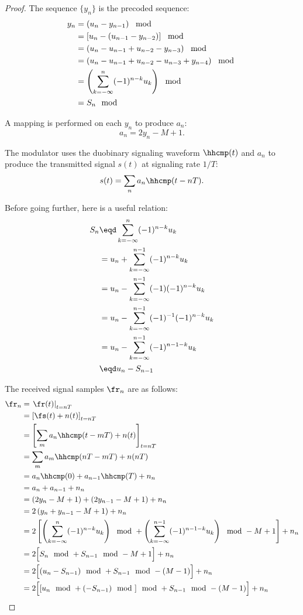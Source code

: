 \begin{proof}

The sequence $\{y_n\}$ is the precoded sequence:
\begin{align*}
   y_n
     &= \left( u_n - y_{n-1} \right)\mod
   \\&= \left[ u_n - (u_{n-1}-y_{n-2}) \right]\mod
   \\&= \left( u_n - u_{n-1} + u_{n-2}-y_{n-3} \right)\mod
   \\&= \left( u_n - u_{n-1} + u_{n-2}-u_{n-3}+y_{n-4} \right)\mod
   \\&= \left( \sum_{k=-\infty}^n (-1)^{n-k} u_k \right)\mod
   \\&= S_n \mod
\end{align*}

A mapping is performed on each $y_n$ to produce $a_n$:
\[ a_n = 2y_n - M + 1.\]

The modulator uses the duobinary signaling waveform $\hhcmp(t)$
and $a_n$ to produce the transmitted signal $s(t)$ at signaling
rate $1/T$:
\[ s(t) = \sum_n a_n \hhcmp(t-nT). \]


Before going further, here is a useful relation:
\begin{align*}
  S_n
    &\eqd \sum_{k=-\infty}^{n} (-1)^{n-k} u_k
  \\&=    u_n + \sum_{k=-\infty}^{n-1} (-1)^{n-k} u_k
  \\&=    u_n - \sum_{k=-\infty}^{n-1} (-1)(-1)^{n-k} u_k
  \\&=    u_n - \sum_{k=-\infty}^{n-1} (-1)^{-1}(-1)^{n-k} u_k
  \\&=    u_n - \sum_{k=-\infty}^{n-1} (-1)^{n-1-k} u_k
  \\&\eqd u_n - S_{n-1}
\end{align*}


The received signal samples $\fr_n$ are as follows:
\begin{align*}
   \fr_n
     &= \left. \fr(t) \right|_{t=nT}
   \\&= \left[ \fs(t) + n(t) \right]_{t=nT}
   \\&= \left[ \sum_m a_n \hhcmp(t-mT) + n(t) \right]_{t=nT}
   \\&= \sum_m a_m \hhcmp(nT-mT) + n(nT)
   \\&= a_n\hhcmp(0) + a_{n-1}\hhcmp(T) + n_n
   \\&= a_n + a_{n-1} + n_n
   \\&= \left( 2y_n - M + 1 \right) + \left(2y_{n-1} - M + 1 \right) + n_n
   \\&= 2\left( y_n + y_{n-1} - M + 1 \right) + n_n
   \\&= 2\left[
          \left( \sum_{k=-\infty}^n (-1)^{n-k} u_k \right)\mod +
          \left( \sum_{k=-\infty}^{n-1} (-1)^{n-1-k} u_k \right)\mod
          - M + 1 \right] + n_n
   \\&= 2\Big[ S_n\mod + S_{n-1}\mod - M + 1 \Big] + n_n
   \\&= 2\Big[ (u_n - S_{n-1})\mod + S_{n-1}\mod - (M - 1) \Big] + n_n
   \\&= 2\Big[ [u_n\mod + (- S_{n-1})\mod]\mod + S_{n-1}\mod - (M - 1) \Big] + n_n
\end{align*}


\end{proof}
